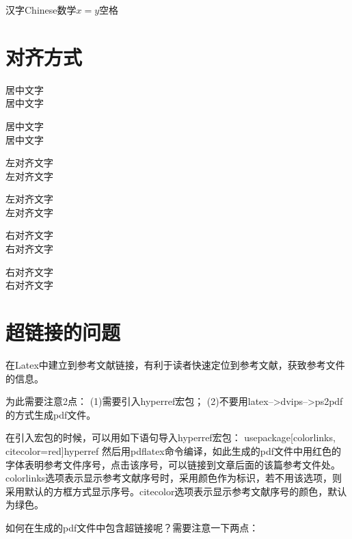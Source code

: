 \documentclass[11pt,a4paper]{article}
\begin{document}
汉字Chinese数学$x=y$空格


\section{对齐方式}
\begin{center}
居中文字 \\
居中文字
\end{center}
 
\noindent
\begin{minipage}{\linewidth}
\centering
居中文字 \\
居中文字
\end{minipage}
 
\begin{flushleft}
左对齐文字 \\
左对齐文字
\end{flushleft}
 
\noindent
\begin{minipage}{\linewidth}
\raggedright
左对齐文字 \\
左对齐文字
\end{minipage}
 
\begin{flushright}
右对齐文字 \\
右对齐文字
\end{flushright}
 
\noindent
\begin{minipage}{\linewidth}
\raggedleft
右对齐文字 \\
右对齐文字
\end{minipage}


\section{超链接的问题}

 在Latex中建立到参考文献链接，有利于读者快速定位到参考文献，获致参考文件的信息。

为此需要注意2点： (1)需要引入hyperref宏包； (2)不要用latex-->dvips-->ps2pdf的方式生成pdf文件。

在引入宏包的时候，可以用如下语句导入hyperref宏包：
usepackage[colorlinks, citecolor=red]{hyperref}
然后用pdflatex命令编译，如此生成的pdf文件中用红色的字体表明参考文件序号，点击该序号，可以链接到文章后面的该篇参考文件处。
colorlinks选项表示显示参考文献序号时，采用颜色作为标识，若不用该选项，则采用默认的方框方式显示序号。citecolor选项表示显示参考文献序号的颜色，默认为绿色。

 如何在生成的pdf文件中包含超链接呢？需要注意一下两点：
\end{document}
